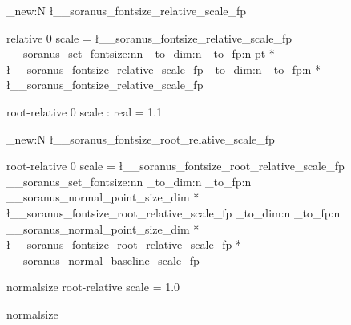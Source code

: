 \fp_new:N \l__soranus_fontsize_relative_scale_fp

 { relative } { 0 }
  {
    scale = \l__soranus_fontsize_relative_scale_fp
  }
  {
    \__soranus_set_fontsize:nn
      {
        \fp_to_dim:n
          {
            \dim_to_fp:n { \f@size pt }
            * \l__soranus_fontsize_relative_scale_fp
          }
      }
      {
        \fp_to_dim:n
          {
            \dim_to_fp:n { \f@baselineskip }
            * \l__soranus_fontsize_relative_scale_fp
          }
      }
  }


%

 { root-relative } { 0 }
  {
    scale : real = 1.1
  }


\fp_new:N \l__soranus_fontsize_root_relative_scale_fp

 { root-relative } { 0 }
  {
    scale = \l__soranus_fontsize_root_relative_scale_fp
  }
  {
    \__soranus_set_fontsize:nn
      {
        \fp_to_dim:n
          {
            \dim_to_fp:n { \g__soranus_normal_point_size_dim }
            * \l__soranus_fontsize_root_relative_scale_fp
          }
      }
      {
        \fp_to_dim:n
          {
            \dim_to_fp:n { \g__soranus_normal_point_size_dim }
            * \l__soranus_fontsize_root_relative_scale_fp
            * \g__soranus_normal_baseline_scale_fp
          }
      }
  }


%

 { normalsize } { root-relative }
  {
    scale = 1.0
  }

\RenewDocumentCommand \normalsize { }
  {  { normalsize } }
